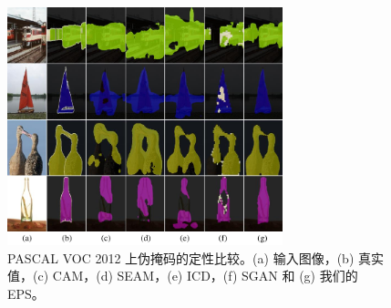 \begin{figure}[t]
\centering
\includegraphics[width=8cm]{figures/fig_ablation.pdf}
\caption{PASCAL VOC 2012 上伪掩码的定性比较。(a) 输入图像，(b) 真实值，(c) CAM，(d) SEAM，(e) ICD，(f) SGAN 和 (g) 我们的 EPS。}
\label{fig:ablation} \vspace{-3mm}
\end{figure}
